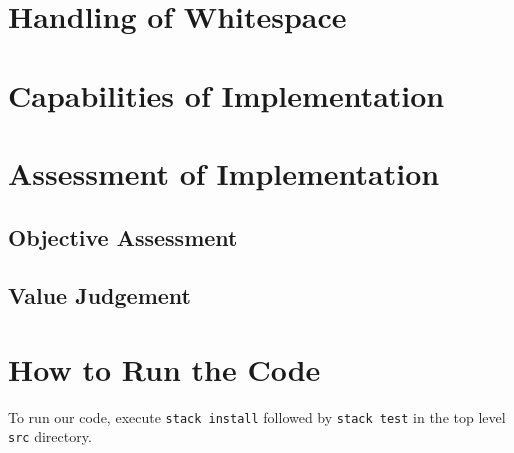 \documentclass{article}
\begin{document}
\section{Handling of Whitespace}


\section{Capabilities of Implementation}


\section{Assessment of Implementation}
\subsection{Objective Assessment}


\subsection{Value Judgement}


\section{How to Run the Code}
To run our code, execute \texttt{stack install} followed by \texttt{stack test} in the top level \texttt{src} directory.
\end{document}
